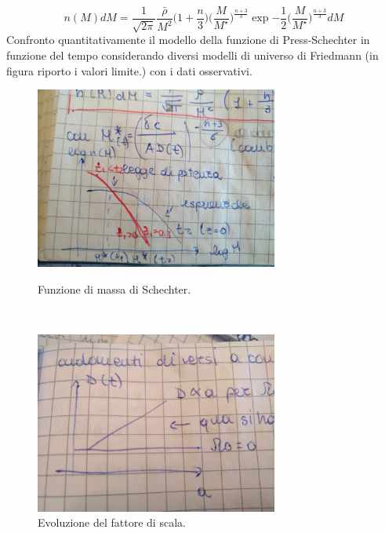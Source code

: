 \documentclass[12pt, a4paper]{article}
\begin{document}
\begin{equation}
n(M)dM=\frac{1}{\sqrt{2\pi}}\frac{\bar{\rho}}{M^2}\biggl(1+\frac{n}{3}\biggr)\biggl(\frac{M}{M^{\star}}\biggr)^{\frac{n+3}{3}} \exp{-\frac{1}{2}\biggl(\frac{M}{M^{\star}}\biggr)^{\frac{n+3}{3}}} dM
\end{equation}Confronto quantitativamente il modello della funzione di Press-Schechter in funzione del tempo considerando diversi modelli di universo di Friedmann (in figura riporto i valori limite.) con i dati osservativi.
\begin{figure}[htp]
\begin{minipage}[b]{8.5cm}
\centering
\includegraphics[width=8cm]{images/schechter.jpeg}
\caption{Funzione di massa di Schechter.}
\end{minipage}
\ \hspace{2mm} \hspace{3mm} \
\begin{minipage}[b]{8.5cm}
\centering
\includegraphics[width=8cm]{images/evD.jpeg}
\caption{Evoluzione del fattore di scala.}
\end{minipage}
\label{fig:massfunc}
\end{figure}
\end{document}
